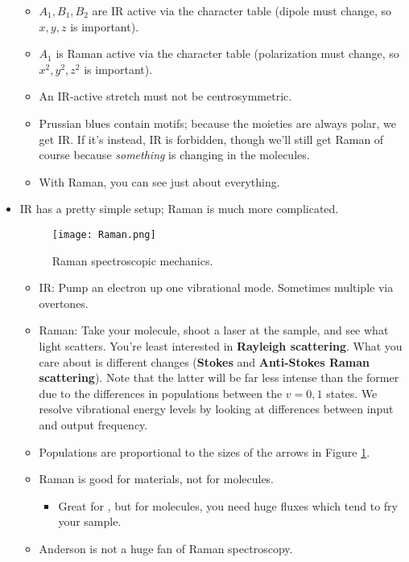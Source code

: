 \documentclass[../notes.tex]{subfiles}
\begin{document}
\begin{itemize}
\begin{itemize}
\begin{itemize}
        \end{itemize}
        \item $A_1,B_1,B_2$ are IR active via the character table (dipole must change, so $x,y,z$ is important).
        \item $A_1$ is Raman active via the character table (polarization must change, so $x^2,y^2,z^2$ is important).
        \item An IR-active stretch must not be centrosymmetric.
        \item Prussian blues contain  motifs; because the  moieties are always polar, we get IR. If it's  instead, IR is forbidden, though we'll still get Raman of course because \emph{something} is changing in the molecules.
        \item With Raman, you can see just about everything.
    \end{itemize}
    \item IR has a pretty simple setup; Raman is much more complicated.
    \begin{figure}[H]
        \centering
        \texttt{[image: Raman.png]}
        \caption{Raman spectroscopic mechanics.}
        \label{fig:Raman}
    \end{figure}
    \begin{itemize}
        \item IR: Pump an electron up one vibrational mode. Sometimes multiple via overtones.
        \item Raman: Take your molecule, shoot a laser at the sample, and see what light scatters. You're least interested in \textbf{Rayleigh scattering}. What you care about is different changes (\textbf{Stokes} and \textbf{Anti-Stokes Raman scattering}). Note that the latter will be far less intense than the former due to the differences in populations between the $v=0,1$ states. We resolve vibrational energy levels by looking at differences between input and output frequency.
        \item Populations are proportional to the sizes of the arrows in Figure \ref{fig:Raman}.
        \item Raman is good for materials, not for molecules.
        \begin{itemize}
            \item Great for , but for molecules, you need huge fluxes which tend to fry your sample.
        \end{itemize}
        \item Anderson is not a huge fan of Raman spectroscopy.

\end{itemize}
\end{itemize}
\end{document}
